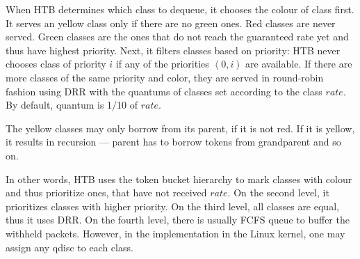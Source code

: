 When HTB determines which class to dequeue, it chooses the colour of class first. It serves an yellow class only if there are no green ones. Red classes are never served. Green classes are the ones that do not reach the guaranteed rate yet and thus have highest priority. Next, it filters classes based on priority: HTB never chooses class of priority $i$ if any of the priorities $\left\langle0,i\right)$ are available. If there are more classes of the same priority and color, they are served in round-robin fashion using DRR with the quantums of classes set according to the class $rate$. By default, quantum is 1/10 of $rate$. 

The yellow classes may only borrow from its parent, if it is not red. If it is yellow, it results in recursion --- parent has to borrow tokens from grandparent and so on.

In other words, HTB uses the token bucket hierarchy to mark classes with colour and thus prioritize ones, that have not received $rate$. On the second level, it prioritizes classes with higher priority. On the third level, all classes are equal, thus it uses DRR. On the fourth level, there is usually FCFS queue to buffer the withheld packets. However, in the implementation in the Linux kernel, one may assign any qdisc to each class.

